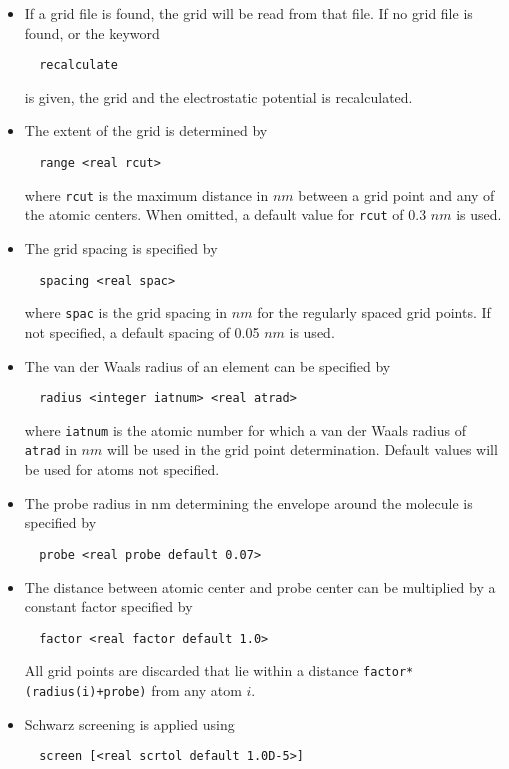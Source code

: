 \begin{itemize}
\item
If a grid file is found, the grid will be read from that file. If no grid
file is found, or the keyword
\begin{verbatim}
  recalculate
\end{verbatim}
is given, the grid and the electrostatic potential is recalculated.
\item
The extent of the grid is determined by
\begin{verbatim}
  range <real rcut>
\end{verbatim}
where \verb+rcut+ is the maximum distance in $nm$ between a grid point and
any of the atomic centers. When omitted, a default value for \verb+rcut+ of
0.3 $nm$ is used.
\item
The grid spacing is specified by
\begin{verbatim}
  spacing <real spac>
\end{verbatim}
where \verb+spac+ is the grid spacing in $nm$ for the regularly spaced
grid points. If not specified, a default spacing of 0.05 $nm$ is used.
\item
The van der Waals radius of an element can be specified by
\begin{verbatim}
  radius <integer iatnum> <real atrad>
\end{verbatim}
where \verb+iatnum+ is the atomic number for which a van der Waals radius
of \verb+atrad+ in $nm$ will be used in the grid point determination.
Default values will be used for atoms not specified.
\item
The probe radius in nm determining the envelope around the molecule is
specified by
\begin{verbatim}
  probe <real probe default 0.07> 
\end{verbatim}
\item
The distance between atomic center and probe center can be multiplied
by a constant factor specified by
\begin{verbatim}
  factor <real factor default 1.0> 
\end{verbatim}
All grid points are discarded that lie within a distance 
\verb-factor*(radius(i)+probe)- from any atom $i$.
\item
Schwarz screening is applied using
\begin{verbatim}
  screen [<real scrtol default 1.0D-5>]
\end{verbatim}
\end{itemize}

